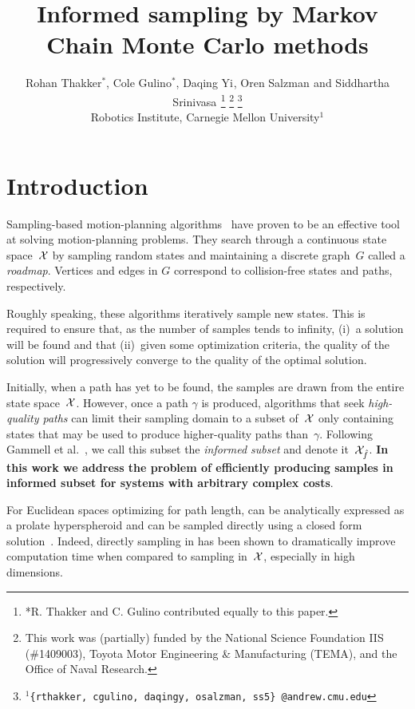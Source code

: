 \documentclass[letterpaper, 10 pt, conference]{ieeeconf}  %
\title{\LARGE \bf
Informed sampling by Markov Chain Monte Carlo methods
}
\author{
Rohan Thakker$^{*}$,
Cole Gulino$^{*}$,
Daqing Yi$^{}$,
Oren Salzman$^{}$ and
Siddhartha Srinivasa$^{}$%
\thanks{*R. Thakker and C. Gulino contributed equally to this paper.}
\thanks{This work was (partially) funded by the National Science Foundation IIS (\#1409003), Toyota Motor Engineering \& Manufacturing (TEMA), and the Office of Naval Research.}%
\thanks{$^{1}${\tt\small \{rthakker, cgulino, daqingy, osalzman, ss5\} @andrew.cmu.edu}}%
%
\\        
Robotics Institute, Carnegie Mellon University$^{1}$
}
\begin{document}
\maketitle
\thispagestyle{empty}
\pagestyle{empty}


\begin{abstract}

\end{abstract}


\section{Introduction}
\label{sec:intro}


Sampling-based motion-planning algorithms~\cite{CBHKKLT05, L06} have proven to be an effective tool at solving motion-planning problems.
They search through a continuous state space~$\mathcal{X}$ by sampling random states and maintaining a discrete graph~$G$ called a \emph{roadmap}.
Vertices and edges in $G$ correspond to collision-free states and paths, respectively.

Roughly speaking, these algorithms iteratively sample new states.
This is required to ensure that, as the number of samples tends to infinity, 
(i)~a solution will be found 
and that
(ii)~given some optimization criteria, the quality of the solution will progressively converge to the quality of the optimal solution.

Initially, 
when a path has yet to be found, 
the samples are drawn from the entire state space~$\mathcal{X}$.
However, once a path $\gamma$ is produced,  algorithms that seek \emph{high-quality paths} can limit their sampling domain to a subset of~$\mathcal{X}$ only  containing states that may be used to produce higher-quality paths than~$\gamma$.
Following Gammell et al.~\cite{GSB14}, we call this subset the \emph{informed subset} and denote it~$\mathcal{X}_{\hat{f}}$.
\textbf{In this work we address the problem of efficiently producing samples in informed subset for systems with arbitrary complex costs}. 

For Euclidean spaces optimizing for path length, 
\Cinf can be analytically expressed as a prolate hyperspheroid and can be sampled directly using a closed form solution~\cite{GSB14}.
Indeed, directly sampling in \Cinf has been shown to dramatically improve computation time when compared to sampling in~$\mathcal{X}$, especially in high dimensions. 
\end{document}

